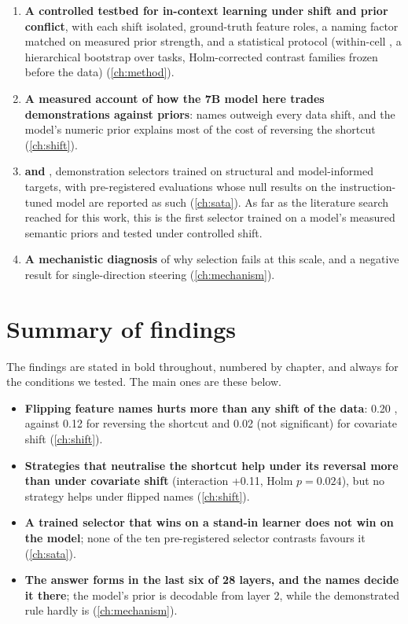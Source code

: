 \begin{enumerate}[leftmargin=2em]
  \item \textbf{A controlled testbed for in-context learning under shift and prior conflict}, with each shift isolated, ground-truth feature roles, a naming factor matched on measured prior strength, and a statistical protocol (within-cell \AUROC, a hierarchical bootstrap over tasks, Holm-corrected contrast families frozen before the data) (\autoref{ch:method}).
  \item \textbf{A measured account of how the 7B model here trades demonstrations against priors}: names outweigh every data shift, and the model's numeric prior explains most of the cost of reversing the shortcut (\autoref{ch:shift}).
  \item \textbf{\sata and \satami}, demonstration selectors trained on structural and model-informed targets, with pre-registered evaluations whose null results on the instruction-tuned model are reported as such (\autoref{ch:sata}).
        As far as the literature search reached for this work, this is the first selector trained on a model's measured semantic priors and tested under controlled shift.
  \item \textbf{A mechanistic diagnosis} of why selection fails at this scale, and a negative result for single-direction steering (\autoref{ch:mechanism}).
\end{enumerate}

\section{Summary of findings}

The findings are stated in bold throughout, numbered by chapter, and always for the conditions we tested.
The main ones are these below.

\begin{itemize}[leftmargin=1.5em]
  \item \textbf{Flipping feature names hurts more than any shift of the data}: 0.20 \AUROC, against 0.12 for reversing the shortcut and 0.02 (not significant) for covariate shift (\autoref{ch:shift}).
  \item \textbf{Strategies that neutralise the shortcut help under its reversal more than under covariate shift} (interaction +0.11, Holm $p = 0.024$), but no strategy helps under flipped names (\autoref{ch:shift}).
  \item \textbf{A trained selector that wins on a stand-in learner does not win on the model}; none of the ten pre-registered selector contrasts favours it (\autoref{ch:sata}).
  \item \textbf{The answer forms in the last six of 28 layers, and the names decide it there}; the model's prior is decodable from layer 2, while the demonstrated rule hardly is (\autoref{ch:mechanism}).
\end{itemize}